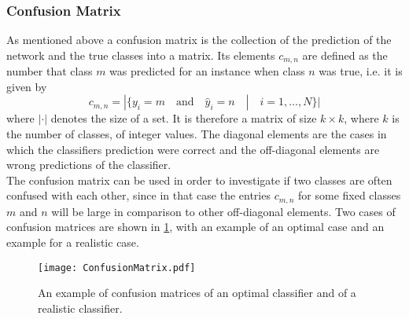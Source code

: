 \subsubsection{Confusion Matrix}

As mentioned above a confusion matrix is the collection of the prediction of the network and the true classes into a matrix. Its elements $c_{m,n}$ are defined as the number that class $m$ was predicted for an instance when class $n$ was true, i.e. it is given by
\begin{equation}
c_{m,n} = | \{y_i = m \quad \textrm{and} \quad \hat{y}_i = n \quad | \quad i=1,\dots,N  \} |
\end{equation}
where $|\cdot |$ denotes the size of a set. It is therefore a matrix of size $k\times k$, where $k$ is the number of classes, of integer values. The diagonal elements are the cases in which the classifiers prediction were correct and the off-diagonal elements are wrong predictions of the classifier. \\

The confusion matrix can be used in order to investigate if two classes are often confused with each other, since in that case the entries $c_{m,n}$ for some fixed classes $m$ and $n$ will be large in comparison to other off-diagonal elements. Two cases of confusion matrices are shown in \ref{fig:ConfusionMatrix}, with an example of an optimal case and an example for a realistic case. \\

\begin{figure}[H]
\centering
\texttt{[image: ConfusionMatrix.pdf]}
\caption{An example of confusion matrices of an optimal classifier and of a realistic classifier.}
\label{fig:ConfusionMatrix}
\end{figure}



